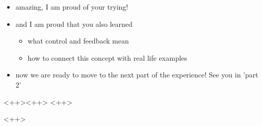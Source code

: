 \begin{frame}
	\begin{itemize}
		\item amazing, I am proud of your trying!
		\item and I am proud that you also learned
			\begin{itemize}
				\item what control and feedback mean
				\item how to connect this concept with real life examples
			\end{itemize}
		\item now we are ready to move to the next part of the experience! See you in 'part 2'
	\end{itemize}
\end{frame}




\begin{frame}{<++>}{<++>}
	<++>
	\note<1-1>{\begin{itemize}
		\item <++>
	\end{itemize}}
\end{frame}
<++>


